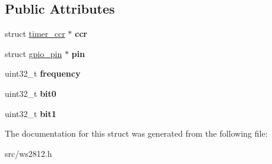 \subsection*{Public Attributes}
\begin{DoxyCompactItemize}
\item 
\hypertarget{structws2812__config_a0c4b50ce11c055c0457af653c4951ee9}{}struct \hyperlink{structtimer__ccr}{timer\+\_\+ccr} $\ast$ {\bfseries ccr}\label{structws2812__config_a0c4b50ce11c055c0457af653c4951ee9}

\item 
\hypertarget{structws2812__config_a665ce3190145f97af1d234f9de5defc1}{}struct \hyperlink{structgpio__pin}{gpio\+\_\+pin} $\ast$ {\bfseries pin}\label{structws2812__config_a665ce3190145f97af1d234f9de5defc1}

\item 
\hypertarget{structws2812__config_a15634a419d7f20275ec1e6ba1215920b}{}uint32\+\_\+t {\bfseries frequency}\label{structws2812__config_a15634a419d7f20275ec1e6ba1215920b}

\item 
\hypertarget{structws2812__config_a22370b6dc4cdf5c6e25c4c155a275046}{}uint32\+\_\+t {\bfseries bit0}\label{structws2812__config_a22370b6dc4cdf5c6e25c4c155a275046}

\item 
\hypertarget{structws2812__config_a410b277b06bbb4ff2f8fd8c6fb5bc994}{}uint32\+\_\+t {\bfseries bit1}\label{structws2812__config_a410b277b06bbb4ff2f8fd8c6fb5bc994}

\end{DoxyCompactItemize}


The documentation for this struct was generated from the following file\+:\begin{DoxyCompactItemize}
\item 
src/ws2812.\+h\end{DoxyCompactItemize}
